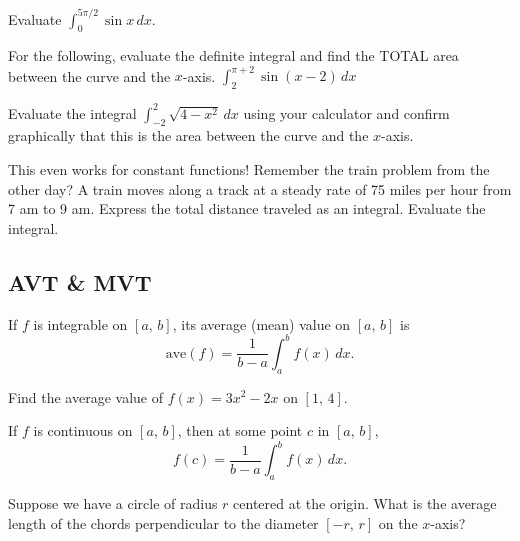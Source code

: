 \documentclass[addpoints, 12pt]{exam}
\begin{document}
\begin{questions}
    \question Evaluate $\displaystyle\int_0^{5\pi/2}\sin x\,dx$.
    
    For the following, evaluate the definite integral and find the TOTAL area between the curve and the $x$-axis.
    \question $\displaystyle\int_2^{\pi+2}\sin(x-2)\,dx$
    
    \question Evaluate the integral $\displaystyle\int_{-2}^{2}\sqrt{4-x^2}\,dx$ using your calculator and confirm graphically that this is the area between the curve and the $x$-axis.
    
    This even works for constant functions! Remember the train problem from the other day? A train moves along a track at a steady rate of 75 miles per hour from 7 am to 9 am. Express the total distance traveled as an integral. Evaluate the integral.
\end{questions}



\newpage
{}
\subsection*{AVT \& MVT}
\begin{tcolorbox}[title= AVERAGE VALUE OF A FUNCTION,colframe=black,sharp corners,colback=white,colbacktitle=white,coltitle=black,boxrule=1pt]

     If $f$ is integrable on $[a,\,b]$, its average (mean) value on $[a,\,b]$ is
     \[\text{ave}(f)=\frac{1}{b-a}\int_a^b f(x)\,dx.\]
    
\end{tcolorbox}
\begin{questions}
    \question Find the average value of $f(x)=3x^2-2x$ on $[1,\,4]$.
\end{questions}

\begin{tcolorbox}[title= THE MEAN VALUE THEOREM FOR DEFINITE INTEGRALS,colframe=black,sharp corners,colback=white,colbacktitle=white,coltitle=black,boxrule=1pt]

     If $f$ is continuous on $[a,\,b]$, then at some point $c$ in $[a,\,b]$,
     \[f(c)=\frac{1}{b-a}\int_a^b f(x)\,dx.\]
    
\end{tcolorbox}
\begin{questions}
    \setcounter{question}{1}
    \question Suppose we have a circle of radius $r$ centered at the origin. What is the average length of the chords perpendicular to the diameter $[-r,\,r]$ on the $x$-axis?
\end{questions}
\end{document}
